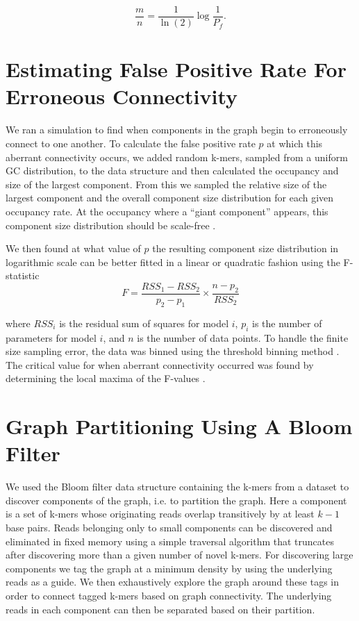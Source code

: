 \documentclass{pnastwo}
\begin{document}
\begin{article}
\begin{materials}
\begin{displaymath}
\frac{m}{n} = \frac{1}{\ln(2)} \log{\frac{1}{P_f}}.
\end{displaymath}

\section{Estimating False Positive Rate For Erroneous Connectivity}
We ran a simulation to find when components in the graph 
begin to erroneously connect to one another.
To calculate the false positive rate $p$ at which this aberrant 
connectivity occurs, 
we added random k-mers, sampled from a uniform GC distribution, to the data structure 
and then calculated the occupancy and size of 
the largest 
component. From this we sampled the relative size of 
the largest component and the overall component size distribution for each
given occupancy rate.
At the occupancy where a ``giant component'' appears, this component size distribution 
should be scale-free \cite{stauffer1979scaling}. 

We then found at what value of $p$ the resulting 
component size distribution in logarithmic 
scale can be better fitted in a linear or quadratic fashion using 
the F-statistic
\newline
\newline
\begin{displaymath}
F=\frac{RSS_1-RSS_2}{p_2-p_1} \times \frac{n - p_2}{RSS_2}
\end{displaymath}

where $RSS_i$ is the residual sum of squares for model $i$, $p_i$ is 
the number of parameters for model $i$, and $n$ is the number of data 
points. To handle the finite size sampling error, the data was binned using the 
threshold binning method \cite{adami2002critical}. The critical value for 
when aberrant connectivity occurred was found by determining the local maxima 
of the F-values \cite{wald43}.

\section{Graph Partitioning Using A Bloom Filter}

We used the Bloom filter data structure containing the k-mers from a
dataset to discover components of the graph, i.e. to partition the
graph.  Here a component is a set of k-mers whose originating reads
overlap transitively by at least $k-1$ base pairs.  Reads belonging only
to small components can be discovered and eliminated in fixed
memory using a simple traversal algorithm that truncates after
discovering more than a given number of novel k-mers.  For discovering
large components we tag the graph at a minimum density by using the
underlying reads as a guide.  We then exhaustively explore the graph
around these tags in order to connect tagged k-mers based on graph
connectivity.  The underlying reads in each component can then be
separated based on their partition.


\end{materials}
\end{article}
\end{document}
